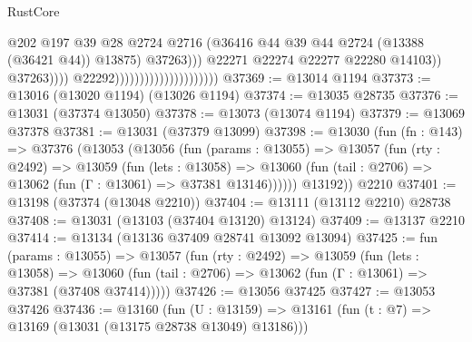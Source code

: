 \begin{lexlean}{RustCore}
\begin{coremodule}
                                                                @202
                                                                @197
                                                                @39
                                                                @28
                                                                @2724
                                                                @2716
                                                                (@36416
                                                                  @44
                                                                  @39
                                                                  @44
                                                                  @2724
                                                                  (@13388 (@36421 @44))
                                                                  @13875)
                                                                @37263)))
                                                          @22271
                                                          @22274
                                                          @22277
                                                          @22280
                                                          @14103))
                                                      @37263))))
                                              @22292)))))))))))))))))))))
@37369 := @13014 @1194
@37373 := @13016 (@13020 @1194) (@13026 @1194)
@37374 := @13035 @28735
@37376 := @13031 (@37374 @13050)
@37378 := @13073 (@13074 @1194)
@37379 := @13069 @37378
@37381 := @13031 (@37379 @13099)
@37398 := @13030
    (fun (fn : @143) =>
    @37376
      (@13053
        (@13056
          (fun (params : @13055) =>
          @13057
            (fun (rty : @2492) =>
            @13059
              (fun (lets : @13058) =>
              @13060 (fun (tail : @2706) => @13062 (fun (Γ : @13061) => @37381 @13146))))))
        @13192))
    @2210
@37401 := @13198 (@37374 (@13048 @2210))
@37404 := @13111 (@13112 @2210) @28738
@37408 := @13031 (@13103 (@37404 @13120) @13124)
@37409 := @13137 @2210
@37414 := @13134 (@13136 @37409 @28741 @13092 @13094)
@37425 := fun (params : @13055) =>
  @13057
    (fun (rty : @2492) =>
    @13059
      (fun (lets : @13058) =>
      @13060 (fun (tail : @2706) => @13062 (fun (Γ : @13061) => @37381 (@37408 @37414)))))
@37426 := @13056 @37425
@37427 := @13053 @37426
@37436 := @13160
    (fun (U : @13159) => @13161 (fun (t : @7) => @13169 (@13031 (@13175 @28738 @13049) @13186)))

\end{coremodule}
\end{lexlean}
